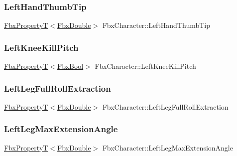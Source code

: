 \subsubsection{\texorpdfstring{Left\+Hand\+Thumb\+Tip}{LeftHandThumbTip}}
{\footnotesize\ttfamily \hyperlink{class_fbx_property_t}{Fbx\+PropertyT}$<$\hyperlink{fbxtypes_8h_a171e72a1c46fc15c1a6c9c31948c1c5b}{Fbx\+Double}$>$ Fbx\+Character\+::\+Left\+Hand\+Thumb\+Tip}

\mbox{\label{class_fbx_character_afd58feb02aeb1bc42fc0e367e3a51404}} 
\subsubsection{\texorpdfstring{Left\+Knee\+Kill\+Pitch}{LeftKneeKillPitch}}
{\footnotesize\ttfamily \hyperlink{class_fbx_property_t}{Fbx\+PropertyT}$<$\hyperlink{fbxtypes_8h_a92e0562b2fe33e76a242f498b362262e}{Fbx\+Bool}$>$ Fbx\+Character\+::\+Left\+Knee\+Kill\+Pitch}

\mbox{\label{class_fbx_character_aec7cb86bbe26ae7eed3e7e26f026221a}} 
\subsubsection{\texorpdfstring{Left\+Leg\+Full\+Roll\+Extraction}{LeftLegFullRollExtraction}}
{\footnotesize\ttfamily \hyperlink{class_fbx_property_t}{Fbx\+PropertyT}$<$\hyperlink{fbxtypes_8h_a171e72a1c46fc15c1a6c9c31948c1c5b}{Fbx\+Double}$>$ Fbx\+Character\+::\+Left\+Leg\+Full\+Roll\+Extraction}

\mbox{\label{class_fbx_character_a27fc895d26ff251bc59c9758aef2e03f}} 
\subsubsection{\texorpdfstring{Left\+Leg\+Max\+Extension\+Angle}{LeftLegMaxExtensionAngle}}
{\footnotesize\ttfamily \hyperlink{class_fbx_property_t}{Fbx\+PropertyT}$<$\hyperlink{fbxtypes_8h_a171e72a1c46fc15c1a6c9c31948c1c5b}{Fbx\+Double}$>$ Fbx\+Character\+::\+Left\+Leg\+Max\+Extension\+Angle}

